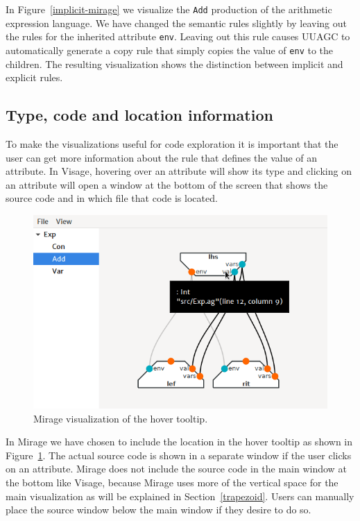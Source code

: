 \documentclass[11pt]{article}
\begin{document}
In Figure~\ref{implicit-mirage} we visualize the \texttt{Add} production of the arithmetic expression language.  We have changed the semantic rules slightly by leaving out the rules for the inherited attribute \texttt{env}. Leaving out this rule causes UUAGC to automatically generate a copy rule that simply copies the value of \texttt{env} to the children. The resulting visualization shows the distinction between implicit and explicit rules.

\subsection{Type, code and location information}

To make the visualizations useful for code exploration it is important that the user can get more information about the rule that defines the value of an attribute. In Visage, hovering over an attribute will show its type and clicking on an attribute will open a window at the bottom of the screen that shows the source code and in which file that code is located.

\begin{figure}[h]
  \centering
  \includegraphics[scale=0.5]{hover-mirage}
  \caption{Mirage visualization of the hover tooltip.}
  \label{hover-mirage}
\end{figure}


In Mirage we have chosen to include the location in the hover tooltip as shown in Figure~\ref{hover-mirage}. The actual source code is shown in a separate window if the user clicks on an attribute. Mirage does not include the source code in the main window at the bottom like Visage, because Mirage uses more of the vertical space for the main visualization as will be explained in Section~\ref{trapezoid}. Users can manually place the source window below the main window if they desire to do so.
\end{document}
